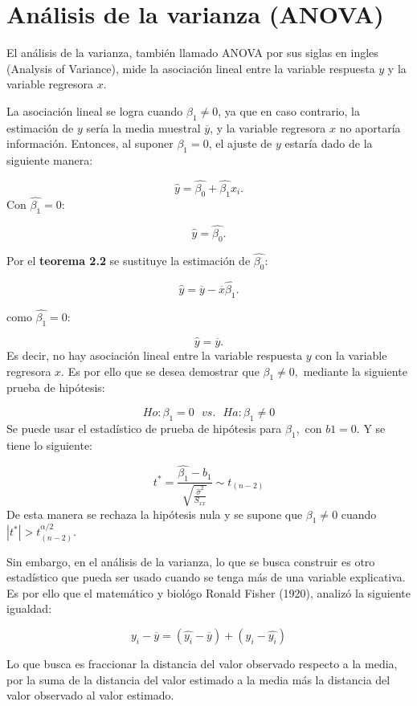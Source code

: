 \documentclass[a4paper,oneside,openany]{book}
\begin{document}
\section{Análisis de la varianza
(ANOVA)}\label{anuxe1lisis-de-la-varianza-anova}

El análisis de la varianza, también llamado ANOVA por sus siglas en
ingles (Analysis of Variance), mide la asociación lineal entre la
variable respuesta \(y\) y la variable regresora \(x\).

La asociación lineal se logra cuando \(\beta_{1}\neq 0\), ya que en caso
contrario, la estimación de \(y\) sería la media muestral
\(\overline{y}\), y la variable regresora \(x\) no aportaría
información. Entonces, al suponer \(\beta_{1}=0\), el ajuste de \(y\)
estaría dado de la siguiente manera:

\[\hat{y}=\hat{\beta_{0}}+\hat{\beta_{1}}x_{i}.\] Con
\(\hat{\beta_{1}}=0:\)

\[\hat{y}=\hat{\beta_{0}}.\]

Por el \textbf{teorema 2.2} se sustituye la estimación de
\(\hat{\beta_{0}}:\)

\[\hat{y}=\overline{y}-\overline{x}\hat{\beta_{1}}.\]

como \(\hat{\beta_{1}}=0:\)

\[\hat{y}=\overline{y}.\] Es decir, no hay asociación lineal entre la
variable respuesta \(y\) con la variable regresora \(x\). Es por ello
que se desea demostrar que \(\beta_{1}\neq 0,\) mediante la siguiente
prueba de hipótesis:

\[Ho:\beta_{1}=0 \ \ \ vs. \ \ \ Ha:\beta_{1} \neq 0\] Se puede usar el
estadístico de prueba de hipótesis para \(\beta_{1},\) con \(b1=0\). Y
se tiene lo siguiente:

\[t^*=\frac{\hat{\beta_{1}}-b_{1}}{\sqrt{\frac{\hat{\sigma}^2}{S_{xx}}}} \sim t_{(n-2)}\]
De esta manera se rechaza la hipótesis nula y se supone que
\(\beta_{1}\neq 0\) cuando \(|t^*|>t^{\alpha/2}_{(n-2)}\).

Sin embargo, en el análisis de la varianza, lo que se busca construir es
otro estadístico que pueda ser usado cuando se tenga más de una variable
explicativa. Es por ello que el matemático y biológo Ronald Fisher
(1920), analizó la siguiente igualdad:

\[y_{i}-\overline{y}=(\hat{y_{i}}-\overline{y})+(y_{i}-\hat{y_{i}})\]

Lo que busca es fraccionar la distancia del valor observado respecto a
la media, por la suma de la distancia del valor estimado a la media más
la distancia del valor observado al valor estimado.
\end{document}
